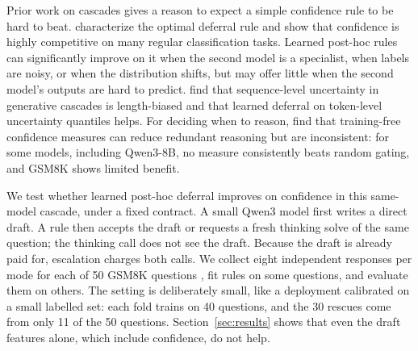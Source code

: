 \documentclass[10pt,letterpaper]{article}
\begin{document}
Prior work on cascades gives a reason to expect a simple confidence rule to be hard to beat. \citet{jitkrittum2023cascade} characterize the optimal deferral rule and show that confidence is highly competitive on many regular classification tasks. Learned post-hoc rules can significantly improve on it when the second model is a specialist, when labels are noisy, or when the distribution shifts, but may offer little when the second model's outputs are hard to predict. \citet{gupta2024lmcascades} find that sequence-level uncertainty in generative cascades is length-biased and that learned deferral on token-level uncertainty quantiles helps. For deciding when to reason, \citet{lewislim2026confidencegated} find that training-free confidence measures can reduce redundant reasoning but are inconsistent: for some models, including Qwen3-8B, no measure consistently beats random gating, and GSM8K shows limited benefit.

We test whether learned post-hoc deferral improves on confidence in this same-model cascade, under a fixed contract. A small Qwen3 model first writes a direct draft. A rule then accepts the draft or requests a fresh thinking solve of the same question; the thinking call does not see the draft. Because the draft is already paid for, escalation charges both calls. We collect eight independent responses per mode for each of 50 GSM8K questions \citep{cobbe2021gsm8k}, fit rules on some questions, and evaluate them on others. The setting is deliberately small, like a deployment calibrated on a small labelled set: each fold trains on 40 questions, and the 30 rescues come from only 11 of the 50 questions. Section~\ref{sec:results} shows that even the draft features alone, which include confidence, do not help.
\end{document}
